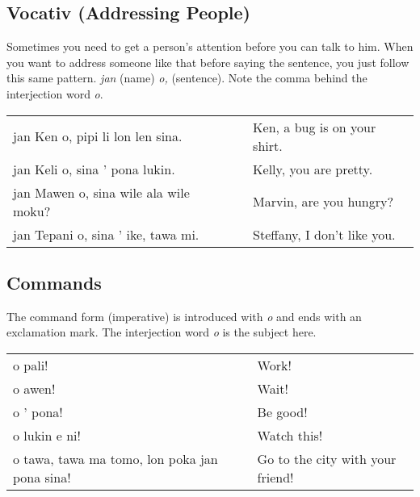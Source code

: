 \newpage
%
\subsection*{Vocativ (Addressing People)}
%
%
Sometimes you need to get a person's attention before you can talk to him.
When you want to address someone like that before saying the sentence, you just follow this same pattern.
\textit{jan} (name) \textit{o,} (sentence).
Note the comma behind the interjection word \textit{o}.

\begin{supertabular}{p{5,5cm}|ll}
    jan Ken o, pipi li lon len sina.      &  & Ken, a bug is on your shirt. \\
    jan Keli o, sina ' pona lukin.        &  & Kelly, you are pretty.       \\
    jan Mawen o, sina wile ala wile moku? &  & Marvin, are you hungry?      \\
    jan Tepani o, sina ' ike, tawa mi.    &  & Steffany, I don't like you.  \\
\end{supertabular}
%
\subsection*{Commands}
%
%

The command form (imperative) is introduced with \textit{o} and ends with an exclamation mark.
The interjection word \textit{o} is the subject here.

\begin{supertabular}{p{5,5cm}|ll}
    o pali!                                       &  & Work!                            \\
    o awen!                                       &  & Wait!                            \\
    o ' pona!                                     &  & Be good!                         \\
    o lukin e ni!                                 &  & Watch this!                      \\
    o tawa, tawa ma tomo, lon poka jan pona sina! &  & Go to the city with your friend! \\
\end{supertabular}

